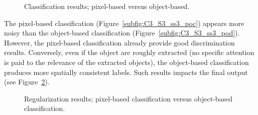 \begin{figure}[htbp]
\begin{center}
{\label{subfig:C3_S3_ss3_pod}
}
\endgroup
\caption{Classification results; pixel-based versus object-based.}
\label{fig:C3_S3_ss3_po}
\end{center}
\end{figure}

The pixel-based classification (Figure~\ref{subfig:C3_S3_ss3_poc}) appears more noisy than the object-based classification (Figure~\ref{subfig:C3_S3_ss3_pod}). However, the pixel-based classification already provide good discrimination results. Conversely, even if the object are roughly extracted (no specific attention is paid to the relevance of the extracted objects), the object-based classification produces more spatially consistent labels. Such results impacts the final output (see Figure~\ref{fig:C3_S3_ss3_rpo}).

\begin{figure}[htbp]
\begin{center}
\begingroup
\captionsetup[subfigure]{width=0.45\textwidth}
\hspace*{0.025\textwidth}
\endgroup
\caption{Regularization results; pixel-based classification versus object-based classification.}
\label{fig:C3_S3_ss3_rpo}
\end{center}
\end{figure}

